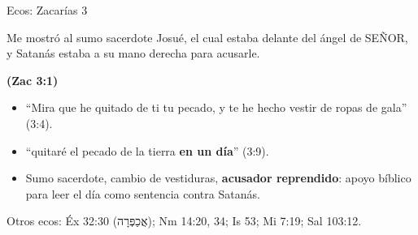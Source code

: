 \documentclass[hyperref={bookmarks=false},aspectratio=169]{beamer}
\newcommand{\heb}[1]{\mbox{\foreignlanguage{hebrew}{#1}}}
\newcommand{\SENOR}{S{\fontsize{0.78em}{1em}\selectfont EÑOR}}
\newcommand{\fuente}[1]{\par\hfill{\upshape\bfseries\footnotesize\textcolor{tierraroja}{#1}}}
\newcommand{\destacar}[1]{\textbf{\textcolor{tierraroja}{#1}}}
\begin{document}
\begin{frame}{Ecos: Zacarías 3}
\begin{cita}Me mostró al sumo sacerdote Josué, el cual estaba delante del ángel de \SENOR, y Satanás estaba a su mano derecha para acusarle.\fuente{(Zac 3:1)}\end{cita}
\small
\begin{itemize}
\item ``Mira que he quitado de ti tu pecado, y te he hecho vestir de ropas de gala'' (3:4).
\item ``quitaré el pecado de la tierra \destacar{en un día}'' (3:9).
\item Sumo sacerdote, cambio de vestiduras, \destacar{acusador reprendido}: apoyo bíblico para leer el día como sentencia contra Satanás.
\end{itemize}
\scriptsize Otros ecos: Éx 32:30 (\heb{אֲכַפְּרָה}); Nm 14:20, 34; Is 53; Mi 7:19; Sal 103:12.
\end{frame}
\end{document}
